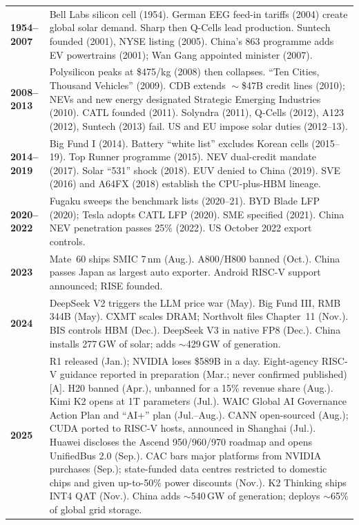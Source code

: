 \begin{table}[htbp]
  \centering
  \scriptsize
  \begin{tabular}{p{16mm}p{134mm}}
    \toprule
    \textbf{1954--2007} & Bell Labs silicon cell (1954). German EEG feed-in tariffs (2004) create global solar demand. Sharp then Q-Cells lead production. Suntech founded (2001), NYSE listing (2005). China's 863 programme adds EV powertrains (2001); Wan Gang appointed minister (2007). \\
    \addlinespace
    \textbf{2008--2013} & Polysilicon peaks at \$475/kg (2008) then collapses. ``Ten Cities, Thousand Vehicles'' (2009). CDB extends $\sim$\$47B credit lines (2010); NEVs and new energy designated Strategic Emerging Industries (2010). CATL founded (2011). Solyndra (2011), Q-Cells (2012), A123 (2012), Suntech (2013) fail. US and EU impose solar duties (2012--13). \\
    \addlinespace
    \textbf{2014--2019} & Big Fund I (2014). Battery ``white list'' excludes Korean cells (2015--19). Top Runner programme (2015). NEV dual-credit mandate (2017). Solar ``531'' shock (2018). EUV denied to China (2019). SVE (2016) and A64FX (2018) establish the CPU-plus-HBM lineage. \\
    \addlinespace
    \textbf{2020--2022} & Fugaku sweeps the benchmark lists (2020--21). BYD Blade LFP (2020); Tesla adopts CATL LFP (2020). SME specified (2021). China NEV penetration passes 25\% (2022). US October 2022 export controls. \\
    \addlinespace
    \textbf{2023} & Mate~60 ships SMIC 7\,nm (Aug.). A800/H800 banned (Oct.). China passes Japan as largest auto exporter. Android RISC-V support announced; RISE founded. \\
    \addlinespace
    \textbf{2024} & DeepSeek V2 triggers the LLM price war (May). Big Fund III, RMB 344B (May). CXMT scales DRAM; Northvolt files Chapter~11 (Nov.). BIS controls HBM (Dec.). DeepSeek V3 in native FP8 (Dec.). China installs 277\,GW of solar; adds $\sim$429\,GW of generation. \\
    \addlinespace
    \textbf{2025} & R1 released (Jan.); NVIDIA loses \$589B in a day. Eight-agency RISC-V guidance reported in preparation (Mar.; never confirmed published) [A]. H20 banned (Apr.), unbanned for a 15\% revenue share (Aug.). Kimi K2 opens at 1T parameters (Jul.). WAIC Global AI Governance Action Plan and ``AI+'' plan (Jul.--Aug.). CANN open-sourced (Aug.); CUDA ported to RISC-V hosts, announced in Shanghai (Jul.). Huawei discloses the Ascend 950/960/970 roadmap and opens UnifiedBus 2.0 (Sep.). CAC bars major platforms from NVIDIA purchases (Sep.); state-funded data centres restricted to domestic chips and given up-to-50\% power discounts (Nov.). K2 Thinking ships INT4 QAT (Nov.). China adds $\sim$540\,GW of generation; deploys $\sim$65\% of global grid storage. \\

\end{tabular}
\end{table}
